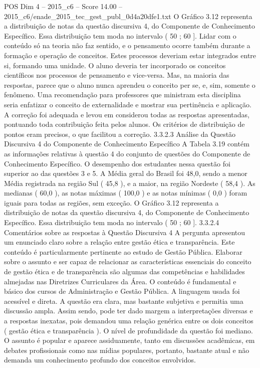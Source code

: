 \begin{textsample}{POS Dim 4 – 2015\_c6 – Score 14.00 – 2015\_c6/enade\_2015\_tec\_gest\_publ\_0d4a20dfe1.txt}
O Gráfico 3.12 representa a distribuição de notas da questão discursiva 4, do Componente de Conhecimento Específico.
Essa distribuição tem moda no intervalo ( 50 ; 60 ].
Lidar com o conteúdo só na teoria não faz sentido, e o pensamento ocorre também durante a formação e operação de conceitos.
Estes processos deveriam estar integrados entre si, formando uma unidade.
O aluno deveria ter incorporado os conceitos científicos nos processos de pensamento e vice-versa.
Mas, na maioria das respostas, parece que o aluno nunca aprendeu o conceito per se, e, sim, somente o fenômeno.
Uma recomendação para professores que ministram esta disciplina seria enfatizar o conceito de externalidade e mostrar sua pertinência e aplicação.
A correção foi adequada e levou em considerou todas as respostas apresentadas, pontuando toda contribuição feita pelos alunos.
Os critérios de distribuição de pontos eram precisos, o que facilitou a correção. 3.3.2.3 Análise da Questão Discursiva 4 do Componente de Conhecimento Específico A Tabela 3.19 contém as informações relativas à questão 4 do conjunto de questões do Componente de Conhecimento Específico.
O desempenho dos estudantes nessa questão foi superior ao das questões 3 e 5.
A Média geral do Brasil foi 48,0, sendo a menor Média registrada na região Sul ( 45,8 ), e a maior, na região Nordeste ( 58,4 ).
As medianas ( 60,0 ), as notas máximas ( 100,0 ) e as notas mínimas ( 0,0 ) foram iguais para todas as regiões, sem exceção.
O Gráfico 3.12 representa a distribuição de notas da questão discursiva 4, do Componente de Conhecimento Específico.
Essa distribuição tem moda no intervalo ( 50 ; 60 ]. 3.3.2.4 Comentários sobre as respostas à Questão Discursiva 4 A pergunta apresentou um enunciado claro sobre a relação entre gestão ética e transparência.
Este conteúdo é particularmente pertinente ao estudo de Gestão Pública.
Elaborar sobre o assunto e ser capaz de relacionar as características essenciais do conceito de gestão ética e de transparência são algumas das competências e habilidades almejadas nas Diretrizes Curriculares da Área.
O conteúdo é fundamental e básico dos cursos de Administração e Gestão Pública.
A linguagem usada foi acessível e direta.
A questão era clara, mas bastante subjetiva e permitia uma discussão ampla.
Assim sendo, pode ter dado margem a interpretações diversas e a respostas inexatas, pois demandou uma relação genérica entre os dois conceitos ( gestão ética e transparência ).
O nível de profundidade da questão foi mediano.
O assunto é popular e aparece assiduamente, tanto em discussões acadêmicas, em debates profissionais como nas mídias populares, portanto, bastante atual e não demanda um conhecimento profundo dos conceitos envolvidos.

\end{textsample}
